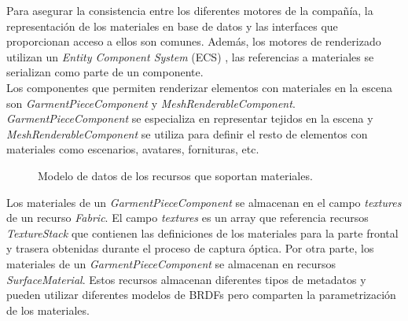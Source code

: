 Para asegurar la consistencia entre los diferentes motores de la compa\~n\'ia, la representaci\'on de los materiales en base de
datos y las interfaces que proporcionan acceso a ellos son comunes. Adem\'as, los motores de renderizado utilizan un \textit{Entity Component System}
(ECS) \autocite{ecs}, las referencias a materiales se serializan como parte de un componente.\\

Los componentes que permiten renderizar elementos con materiales en la escena son \textit{GarmentPieceComponent} y \textit{MeshRenderableComponent}.
\textit{GarmentPieceComponent} se especializa en representar tejidos en la escena y \textit{MeshRenderableComponent}
se utiliza para definir el resto de elementos con materiales como escenarios, avatares, fornituras, etc.

\begin{figure}[H]
  \vspace{0.5cm}
  \centering
  \caption{Modelo de datos de los recursos que soportan materiales.}
  \vspace{0.5cm}
\end{figure}

Los materiales de un \textit{GarmentPieceComponent} se almacenan en el campo \textit{textures} de un recurso \textit{Fabric}. El campo
\textit{textures} es un array que referencia recursos \textit{TextureStack} que contienen las definiciones de los materiales para
la parte frontal y trasera obtenidas durante el proceso de captura \'optica. Por otra parte, los materiales de un \textit{GarmentPieceComponent}
se almacenan en recursos \textit{SurfaceMaterial}. Estos recursos almacenan diferentes tipos de metadatos y pueden utilizar
diferentes modelos de BRDFs pero comparten la parametrizaci\'on de los materiales.









